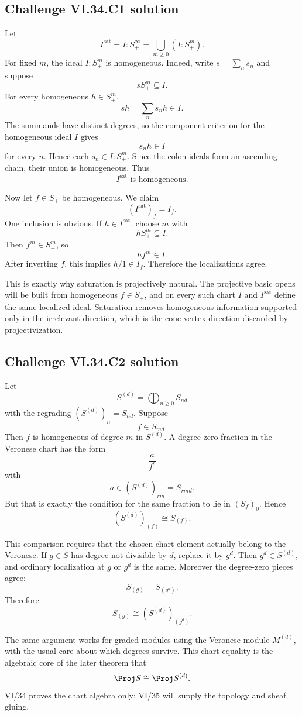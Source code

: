 
\subsection*{Challenge VI.34.C1 solution}
\begin{solution}
Let
\[
I^{\mathrm{sat}}
=
I:S_+^\infty
=
\bigcup_{m\ge0}(I:S_+^m).
\]
For fixed \(m\), the ideal \(I:S_+^m\) is homogeneous. Indeed, write \(s=\sum_ns_n\) and suppose
\[
sS_+^m\subseteq I.
\]
For every homogeneous \(h\in S_+^m\),
\[
sh=\sum_n s_nh\in I.
\]
The summands have distinct degrees, so the component criterion for the homogeneous ideal \(I\) gives
\[
s_nh\in I
\]
for every \(n\). Hence each \(s_n\in I:S_+^m\). Since the colon ideals form an ascending chain, their union is
homogeneous. Thus
\[
\boxed{I^{\mathrm{sat}}\text{ is homogeneous}}.
\]

Now let \(f\in S_+\) be homogeneous. We claim
\[
(I^{\mathrm{sat}})_f=I_f.
\]
One inclusion is obvious. If \(h\in I^{\mathrm{sat}}\), choose \(m\) with
\[
hS_+^m\subseteq I.
\]
Then \(f^m\in S_+^m\), so
\[
hf^m\in I.
\]
After inverting \(f\), this implies \(h/1\in I_f\). Therefore the localizations agree.

This is exactly why saturation is projectively natural. The projective basic opens will be built from homogeneous
\(f\in S_+\), and on every such chart \(I\) and \(I^{\mathrm{sat}}\) define the same localized ideal. Saturation
removes homogeneous information supported only in the irrelevant direction, which is the cone-vertex direction
discarded by projectivization.
\end{solution}

\subsection*{Challenge VI.34.C2 solution}
\begin{solution}
Let
\[
S^{(d)}=\bigoplus_{n\ge0}S_{nd}
\]
with the regrading \((S^{(d)})_n=S_{nd}\). Suppose
\[
f\in S_{md}.
\]
Then \(f\) is homogeneous of degree \(m\) in \(S^{(d)}\). A degree-zero fraction in the Veronese chart has the form
\[
\frac a{f^r}
\]
with
\[
a\in(S^{(d)})_{rm}=S_{rmd}.
\]
But that is exactly the condition for the same fraction to lie in \((S_f)_0\). Hence
\[
\boxed{(S^{(d)})_{(f)}\cong S_{(f)}}.
\]

This comparison requires that the chosen chart element actually belong to the Veronese. If \(g\in S\) has degree
not divisible by \(d\), replace it by \(g^d\). Then \(g^d\in S^{(d)}\), and ordinary localization at \(g\) or
\(g^d\) is the same. Moreover the degree-zero pieces agree:
\[
S_{(g)}=S_{(g^d)}.
\]
Therefore
\[
\boxed{
S_{(g)}
\cong
(S^{(d)})_{(g^d)}.
}
\]

The same argument works for graded modules using the Veronese module \(M^{(d)}\), with the usual care about which
degrees survive. This chart equality is the algebraic core of the later theorem that
\[
\Proj S\cong\Proj S^{(d)}.
\]
VI/34 proves the chart algebra only; VI/35 will supply the topology and sheaf gluing.
\end{solution}

